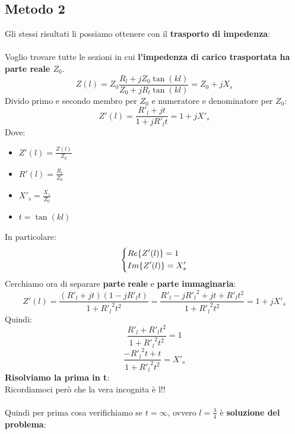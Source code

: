 \subsection{Metodo 2}
Gli stessi risultati li possiamo ottenere con il \textbf{trasporto di impedenza}:\\ \\
Voglio trovare tutte le sezioni in cui \textbf{l'impedenza di carico trasportata ha parte reale $Z_0$}.
\begin{equation*}
    Z(l) = Z_0 \frac{R_l + j Z_0 \tan(kl)}{Z_0 + j R_l \tan(kl)} = Z_0 + j X_s
\end{equation*}
Divido primo e secondo membro per $Z_0$ e numeratore e denominatore per $Z_0$:
\begin{equation*}
    Z'(l) = \frac{R'_l + j t}{1 + j R'_l t} = 1 + j X'_s
\end{equation*}
Dove:
\begin{itemize}
    \item $Z'(l) = \frac{Z(l)}{Z_0}$
    \item $R'(l) = \frac{R_l}{Z_0}$
    \item $X'_s = \frac{X_s}{Z_0}$
    \item $t = \tan(kl)$
\end{itemize}
In particolare:
\begin{equation*}
    \begin{dcases}
    Re\{Z'(l)\} = 1\\
    Im\{Z'(l)\} = X'_s
    \end{dcases}
\end{equation*}
Cerchiamo ora di separare \textbf{parte} \textbf{reale} e \textbf{parte} \textbf{immaginaria}:
\begin{equation*}
    Z'(l) = \frac{(R'_l + j t)(1 - j R'_l t)}{1 +  {R'_l}^2 t^2} = \frac{R'_l - j {R'_l}^2 + jt + R'_l t^2 }{1 + {R'_l}^2 t^2} = 1 + j X'_s
\end{equation*}
Quindi:
\begin{equation*}
    \frac{R'_l + R'_l t^2}{1 +  {R'_l}^2 t^2} = 1
\end{equation*}
\begin{equation*}
    \frac{- {R'_l}^2 t +t}{1 + {R'_l}^2 t^2} = X'_s
\end{equation*}
\textbf{Risolviamo la prima in t}:\\ 
Ricordiamoci però che la vera incognita è l!!\\ \\
Quindi per prima cosa verifichiamo se $t=\infty$, ovvero $l = \frac{\lambda}{4}$ è \textbf{soluzione del problema}:
